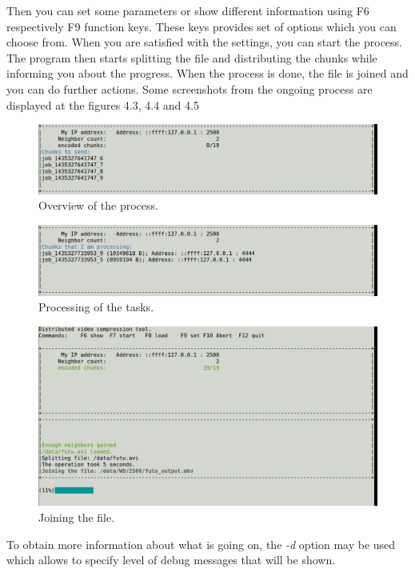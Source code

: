 Then you can set some parameters or show different information using F6 respectively F9 function keys. These keys provides set of options which you can choose from. When you are satisfied with the settings, you can start the process.
The program then starts splitting the file and distributing the chunks while informing you about the progress. When the process is done, the file is joined and you can do further actions. Some screenshots from the ongoing process are displayed at the figures 4.3, 4.4 and 4.5
\begin{figure}[h]
\begin{center}
\includegraphics[scale=0.35]{./img/process-initiator.pdf}
\caption{Overview of the process.}
\end{center}
\end{figure}
\begin{figure}[h]
\begin{center}
\includegraphics[scale=0.35]{./img/processing.pdf}
\caption{Processing of the tasks.}
\end{center}
\end{figure}
\begin{figure}[h]
\begin{center}
\includegraphics[scale=0.35]{./img/joining.pdf}
\caption{Joining the file.}
\end{center}
\end{figure}

To obtain more information about what is going on, the \textit{-d} option may be used which allows to specify level of debug messages that will be shown.